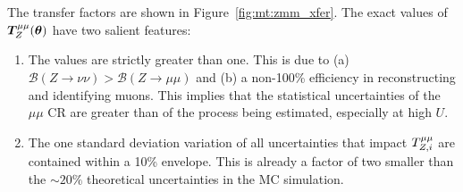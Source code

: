 The transfer factors are shown in Figure~\ref{fig:mt:zmm_xfer}.
The exact values of $\bm{T}^{\mu\mu}_{Z}(\bm\theta)$ have two salient features:
\begin{enumerate}
    \item The values are strictly greater than one.
        This is due to (a) $\mathcal{B}(Z\rightarrow\nu\nu)>\mathcal{B}(Z\rightarrow\mu\mu)$ and (b) a non-100\% efficiency in reconstructing and identifying muons.
        This implies that the statistical uncertainties of the $\mu\mu$ CR are greater than of the process being estimated, especially at high $U$.
    \item The one standard deviation variation of all uncertainties that impact ${T}^{\mu\mu}_{Z,i}$ are contained within a 10\% envelope.
        This is already a factor of two smaller than the $\sim20\%$ theoretical uncertainties in the MC simulation.
\end{enumerate}

